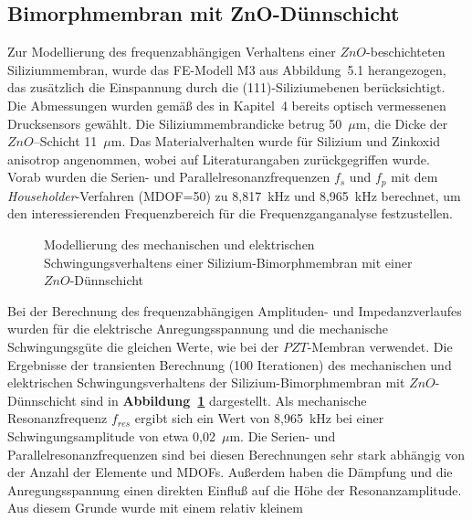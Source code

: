 \subsection{Bimorphmembran mit ZnO-Dünnschicht}
\label{znobimorph}

Zur Modellierung des frequenzabhängigen Verhaltens einer $ZnO$-beschichteten
Siliziummembran, wurde das FE-Modell M3 aus Abbildung~5.1 herangezogen, das
zusätzlich die Einspannung durch die (111)-Siliziumebenen berücksichtigt.
Die Abmessungen wurden gemäß des in Kapitel~4 bereits optisch vermessenen
Drucksensors gewählt. Die Siliziummembrandicke betrug 50~$\mu$m, die Dicke
der $ZnO$--Schicht 11~$\mu$m. Das Materialverhalten wurde für Silizium und
Zinkoxid anisotrop angenommen, wobei auf Literaturangaben \cite{LB82}
zurückgegriffen wurde. Vorab wurden die Serien- und
Parallelresonanzfrequenzen $f_{s}$ und $f_{p}$ mit dem
{\sl Householder}-Verfahren (MDOF=50) zu 8,817~kHz und 8,965~kHz
berechnet, um den interessierenden Frequenzbereich für die
Frequenzganganalyse festzustellen.
\begin{figure}[htb]

\begin{center}

\setabbnfv
\end{center}

\caption{\label{abbimpfem}
 Modellierung des mechanischen und elektrischen Schwingungsverhaltens einer
 Silizium-Bimorphmembran mit einer $ZnO$-Dünnschicht}
\end{figure}
Bei der Berechnung des frequenzabhängigen Amplituden- und Impedanzverlaufes
wurden für die elektrische Anregungsspannung und die mechanische
Schwingungsgüte die gleichen Werte, wie bei der $PZT$-Membran verwendet.
Die Ergebnisse der transienten Berechnung (100 Iterationen) des mechanischen
und elektrischen Schwingungsverhaltens der Silizium-Bimorphmembran mit
$ZnO$-Dünnschicht sind in {\bf Abbildung~\ref{abbimpfem}} dargestellt.
Als mechanische Resonanzfrequenz $f_{res}$ ergibt sich ein Wert von
8,965~kHz bei einer Schwingungsamplitude von etwa 0,02~$\mu$m.
Die Serien- und Parallelresonanzfrequenzen sind bei diesen Berechnungen
sehr stark abhängig von der Anzahl der Elemente und MDOFs. Außerdem haben
die Dämpfung und die Anregungsspannung einen direkten Einfluß auf die Höhe
der Resonanzamplitude. Aus diesem Grunde wurde mit einem relativ kleinem

